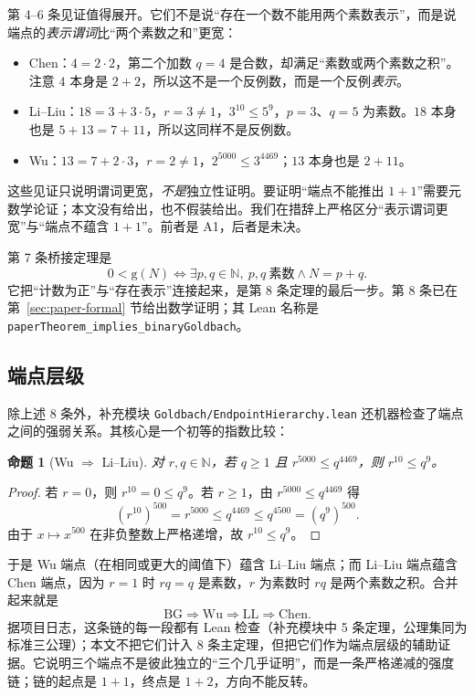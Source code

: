 \documentclass[11pt,a4paper]{ctexart}
\theoremstyle{plain}
\newtheorem{proposition}[theorem]{命题}
\theoremstyle{definition}
\newcommand{\BG}{\mathrm{BG}}
\newcommand{\Chen}{\mathrm{Chen}}
\newcommand{\LL}{\mathrm{LL}}
\newcommand{\WU}{\mathrm{Wu}}
\newcommand{\g}{\mathrm{g}}
\newcommand{\N}{\mathbb{N}}
\begin{document}
第 4--6 条见证值得展开。它们不是说“存在一个数不能用两个素数表示”，而是说端点的\emph{表示谓词}比“两个素数之和”更宽：

\begin{itemize}
\item Chen：$4=2\cdot2$，第二个加数 $q=4$ 是合数，却满足“素数或两个素数之积”。注意 $4$ 本身是 $2+2$，所以这不是一个反例数，而是一个反例\emph{表示}。
\item Li--Liu：$18=3+3\cdot5$，$r=3\ne1$，$3^{10}\le5^9$，$p=3$、$q=5$ 为素数。$18$ 本身也是 $5+13=7+11$，所以这同样不是反例数。
\item Wu：$13=7+2\cdot3$，$r=2\ne1$，$2^{5000}\le3^{4469}$；$13$ 本身也是 $2+11$。
\end{itemize}

这些见证只说明谓词更宽，\emph{不是}独立性证明。要证明“端点不能推出 $1+1$”需要元数学论证；本文没有给出，也不假装给出。我们在措辞上严格区分“表示谓词更宽”与“端点不蕴含 $1+1$”。前者是 A1，后者是未决。

第 7 条桥接定理是
\begin{equation}
0<\g(N)\iff \exists p,q\in\N,\ p,q\ \text{素数}\land N=p+q.
\label{eq:bridge}
\end{equation}
它把“计数为正”与“存在表示”连接起来，是第 8 条定理的最后一步。第 8 条已在第~\ref{sec:paper-formal} 节给出数学证明；其 Lean 名称是 \texttt{paperTheorem\_implies\_binaryGoldbach}。

\subsection{端点层级}
\label{sec:hierarchy}

除上述 8 条外，补充模块 \texttt{Goldbach/EndpointHierarchy.lean} 还机器检查了端点之间的强弱关系。其核心是一个初等的指数比较：

\begin{proposition}[Wu $\Rightarrow$ Li--Liu]
\label{prop:wu-ll}
对 $r,q\in\N$，若 $q\ge1$ 且 $r^{5000}\le q^{4469}$，则 $r^{10}\le q^{9}$。
\end{proposition}
\begin{proof}
若 $r=0$，则 $r^{10}=0\le q^9$。若 $r\ge1$，由 $r^{5000}\le q^{4469}$ 得
\[
(r^{10})^{500}=r^{5000}\le q^{4469}\le q^{4500}=(q^9)^{500}.
\]
由于 $x\mapsto x^{500}$ 在非负整数上严格递增，故 $r^{10}\le q^9$。
\end{proof}

于是 Wu 端点（在相同或更大的阈值下）蕴含 Li--Liu 端点；而 Li--Liu 端点蕴含 Chen 端点，因为 $r=1$ 时 $rq=q$ 是素数，$r$ 为素数时 $rq$ 是两个素数之积。合并起来就是
\[
\BG\Longrightarrow\WU\Longrightarrow\LL\Longrightarrow\Chen.
\]
据项目日志，这条链的每一段都有 Lean 检查（补充模块中 5 条定理，公理集同为标准三公理）；本文不把它们计入 8 条主定理，但把它们作为端点层级的辅助证据。它说明三个端点不是彼此独立的“三个几乎证明”，而是一条严格递减的强度链；链的起点是 $1+1$，终点是 $1+2$，方向不能反转。
\end{document}
